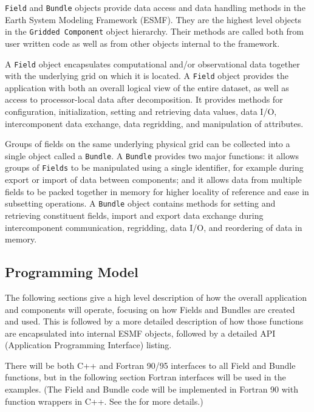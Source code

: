 
{\tt Field} and {\tt Bundle} objects provide 
data access and data handling methods
in the Earth System Modeling Framework (ESMF).
They are the highest level objects in the
{\tt Gridded Component} object hierarchy.
Their methods are called both from user written
code as well as from other objects internal to the framework.

A {\tt Field} 
object encapsulates computational and/or observational data together 
with the underlying grid on which it is located.  
A {\tt Field} object provides the
application with both an overall logical view of the entire
dataset, as well as access to processor-local data after decomposition.
It provides methods for configuration, initialization, setting and
retrieving data values, data I/O, intercomponent data 
exchange, data regridding, and manipulation of attributes.

Groups of fields on the same underlying physical grid 
can be collected into a single
object called a {\tt Bundle}.  
A {\tt Bundle} provides two major functions: it allows groups of 
{\tt Fields}
to be manipulated using a single identifier, for example during
export or import of data between components; and it allows
data from multiple fields to be packed together in memory 
for higher locality of reference and ease in subsetting operations.
A {\tt Bundle} object contains methods
for setting and retrieving constituent fields, import and export
data exchange during intercomponent communication,
regridding, data I/O, and reordering of data in memory.

\subsection{Programming Model}

The following sections give a high level description of how
the overall application and components will operate,
focusing on how Fields and Bundles are created and used.
This is followed by a more detailed description of how
those functions are encapsulated into internal ESMF 
objects, followed by a detailed API (Application Programming
Interface) listing.

There will be both C++ and Fortran 90/95 interfaces to
all Field and Bundle functions, but in the following section
Fortran interfaces will be used in the examples.
(The Field and Bundle code will be
implemented in Fortran 90 with function wrappers in C++.
See the  for more details.)

